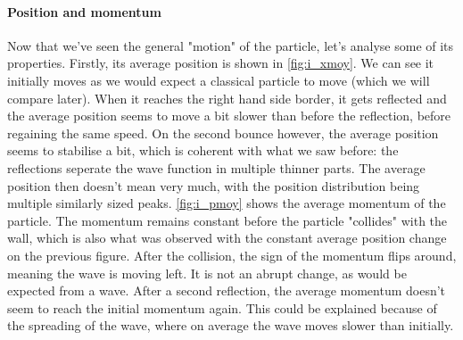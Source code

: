 \paragraph{Position and momentum} Now that we've seen the general "motion" of the particle, let's analyse some of its properties. Firstly, its average position is shown in \autoref{fig:i_xmoy}. We can see it initially moves as we would expect a classical particle to move (which we will compare later). When it reaches the right hand side border, it gets reflected and the average position seems to move a bit slower than before the reflection, before regaining the same speed. On the second bounce however, the average position seems to stabilise a bit, which is coherent with what we saw before: the reflections seperate the wave function in multiple thinner parts. The average position then doesn't mean very much, with the position distribution being multiple similarly sized peaks. \autoref{fig:i_pmoy} shows the average momentum of the particle. The momentum remains constant before the particle "collides" with the wall, which is also what was observed with the constant average position change on the previous figure. After the collision, the sign of the momentum flips around, meaning the wave is moving left. It is not an abrupt change, as would be expected from a wave. After a second reflection, the average momentum doesn't seem to reach the initial momentum again. This could be explained because of the spreading of the wave, where on average the wave moves slower than initially.

